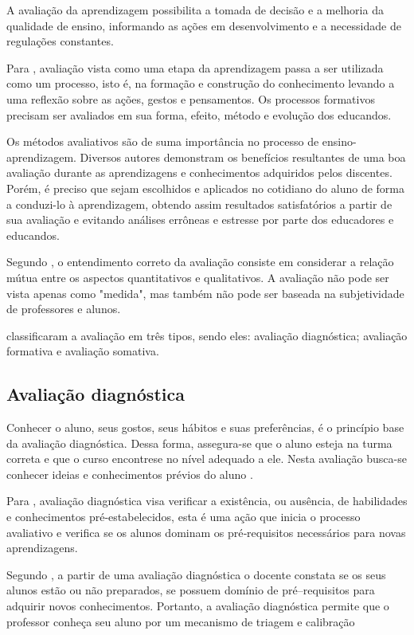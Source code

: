 \documentclass[
	12pt,				%
	openright,			%
	oneside,
	a4paper,			%
	english,			%
	french,				%
	spanish,			%
	brazil,				%
	]{abntex2}
\begin{document}
A avaliação da aprendizagem possibilita a tomada de decisão e a melhoria da qualidade de ensino, informando as ações em desenvolvimento e a necessidade de regulações constantes. \cite{kraemer2005avaliaccao}

Para , avaliação vista como uma etapa da aprendizagem passa a ser utilizada como um processo, isto é, na formação e construção do conhecimento levando a uma reflexão sobre as ações, gestos e pensamentos. Os processos formativos precisam ser avaliados em sua forma, efeito, método e evolução dos educandos.

Os métodos avaliativos são de suma importância no processo de ensino-aprendizagem. Diversos autores demonstram os benefícios resultantes de uma boa avaliação durante as aprendizagens e conhecimentos adquiridos pelos discentes. Porém, é preciso que sejam escolhidos e aplicados no cotidiano do aluno de forma a conduzi-lo à aprendizagem, obtendo assim resultados satisfatórios a partir de sua avaliação e evitando análises errôneas e estresse por parte dos educadores e educandos. \cite{da2014alunos}

Segundo , o entendimento correto da avaliação consiste em considerar a relação mútua entre os aspectos quantitativos e qualitativos. A avaliação não pode ser vista apenas como "medida", mas também não pode ser baseada na subjetividade de professores e alunos.

 classificaram a avaliação em três tipos, sendo eles:
avaliação diagnóstica; avaliação formativa e avaliação somativa.

\subsection{Avaliação diagnóstica}
\label{sec:AvaDiag}
Conhecer o aluno, seus gostos, seus hábitos e suas preferências, é o princípio base da avaliação diagnóstica. Dessa forma, assegura-se que o aluno esteja na turma correta e que o curso encontrese no nível adequado a ele. Nesta avaliação busca-se conhecer ideias e conhecimentos prévios do aluno \cite{masetto1994didatica}.

Para , avaliação diagnóstica visa verificar a existência, ou ausência, de
habilidades e conhecimentos pré‐estabelecidos, esta é uma ação que inicia o
processo avaliativo e verifica se os alunos dominam os pré‐requisitos necessários
para novas aprendizagens.

Segundo , a partir de uma avaliação diagnóstica o docente constata se os seus alunos estão ou não preparados, se possuem domínio de pré–requisitos para adquirir novos conhecimentos. Portanto, a avaliação diagnóstica permite que o professor conheça seu aluno por um mecanismo de triagem e calibração
\end{document}

